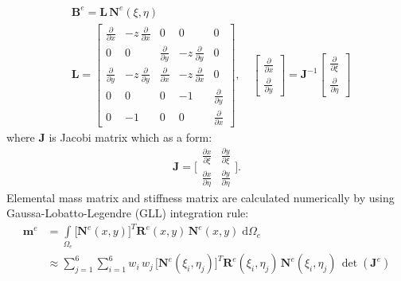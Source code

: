 \documentclass[preprint,12pt]{elsarticle}
\newcommand{\ud}{\mathrm{d}}
\renewcommand{\vec}[1]{\mathbf{#1}}
\renewcommand{\bm}[1]{\mathbf{#1}}
\begin{document}
	\begin{equation}
	\begin{split}
	& \vec{B}^e =  \bm{L} \, \bm{N}^e\!(\xi,\eta) \\ 
	& \bm{L} = \left[\begin{array}{ccccc} \frac{\partial}{\partial x} & -z\, \frac{\partial}{\partial x} & 0 & 0 & 0 \\[4pt]
	0&0&\frac{\partial}{\partial y}&-z\, \frac{\partial}{\partial y}&0\\[4pt]
	\frac{\partial}{\partial y} &-z\,\frac{\partial}{\partial y} & \frac{\partial}{\partial x} &-z\,  \frac{\partial}{\partial x} &0 \\[4pt]
	0&0&0&-1&\frac{\partial}{\partial y} \\[4pt]
	0&-1&0&0&\frac{\partial}{\partial x} \end{array} \right], \quad \left[\begin{array}{c}\frac{\partial }{\partial x}\\[4pt] \frac{\partial }{\partial y}\end{array}\right] = \vec{J}^{-1} \left[\begin{array}{c}\frac{\partial }{\partial \xi}\\[4pt] \frac{\partial }{\partial \eta}\end{array}\right]
	\label{eq:delam_plate_disp_strains}
	\end{split}
	\end{equation} 
	where $\vec{J}$ is Jacobi matrix which as a form:
	\begin{equation}
	\vec{J} = \Bigg[ \begin{array}{cc}\frac{\partial x}{\partial \xi}&\frac{\partial y}{\partial \xi}\\[4pt]
	\frac{\partial x}{\partial \eta}&\frac{\partial y}{\partial \eta}\end{array} \Bigg].
	\label{eq:Jacobi2D}
	\end{equation}
	Elemental mass matrix and stiffness matrix are calculated numerically by using Gaussa-Lobatto-Legendre (GLL) integration rule:
	\begin{equation}
	\begin{split}
	\bm{m}^e &= \int \limits_{\Omega_e} \big[\bm{N}^e\!(x,y)\big]^{\!T} \bm{R}^e\!(x,y) \, \bm{N}^e\!(x,y) \; \ud \Omega_e \\
	&	\approx \sum \limits_{j=1}^{6} \sum \limits_{i=1}^{6} w_i\, w_j \, \big[\bm{N}^e\!(\xi_i, \eta_j)\big]^{\!T} \bm{R}^e\!(\xi_i, \eta_j)	\,
	\bm{N}^e\!(\xi_i,\eta_j) \, \det(\vec{J}^e)\label{eq:delam_plate_mass}
	\end{split}
	\end{equation} 
\end{document}
